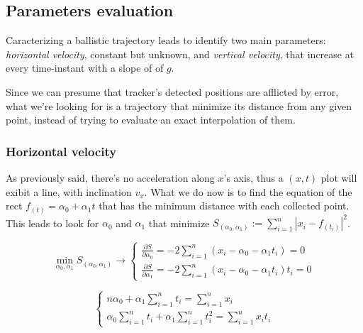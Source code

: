 \documentclass[notitlepage,a4paper,10pt]{article} %
\begin{document}
	\subsection{Parameters evaluation}

		Caracterizing a ballistic trajectory leads to identify two main parameters: \emph{horizontal velocity}, constant but unknown, and \emph{vertical velocity}, that increase at every time-instant with a slope of of $g$.

		Since we can presume that tracker's detected positions are afflicted by error, what we're looking for is a trajectory that minimize its distance from any given point, instead of trying to evaluate an exact interpolation of them.

		\subsubsection{Horizontal velocity}

			As previously said, there's no acceleration along $x$'s axis, thus a $(x,t)$ plot will exibit a line, with inclination $v_x$.
			What we do now is to find the equation of the rect $f_{(t)} = \alpha_0 + \alpha_1 t$ that has the minimum distance with each collected point.
			This leads to look for $\alpha_0$ and $\alpha_1$ that minimize $ S_{(\alpha_0, \alpha_1)} := \sum_{i=1}^n | x_i - f_{(t_i)} |^2 $.

			\begin{equation}
				\min_{\alpha_0, \alpha_1} S_{(\alpha_0, \alpha_1)} \to
				\begin{cases}
					\frac{\partial S}{\partial \alpha_0} = -2 \sum_{i=1}^n (x_i - \alpha_0 - \alpha_1 t_i) = 0 \\
					\frac{\partial S}{\partial \alpha_1} = -2 \sum_{i=1}^n (x_i - \alpha_0 - \alpha_1 t_i) t_i = 0
				\end{cases}
			\end{equation}

			\begin{equation} \label{partder}
				\begin{cases}
					n \alpha_0 + \alpha_1 \sum_{i=1}^n t_i = \sum_{i=1}^n x_i \\
					\alpha_0 \sum_{i=1}^n t_i + \alpha_1 \sum_{i=1}^n t_i^2 = \sum_{i=1}^n x_i t_i
				\end{cases}
			\end{equation}
\end{document}
